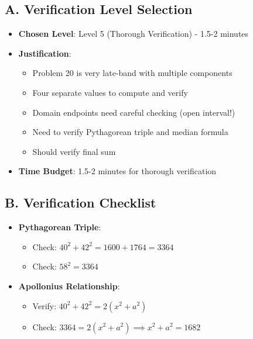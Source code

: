 \documentclass[12pt]{article}
\begin{document}
\begin{verificationbox}
\subsection*{A. Verification Level Selection}
\begin{itemize}[leftmargin=*]
    \item \textbf{Chosen Level}: Level 5 (Thorough Verification) - 1.5-2 minutes
    
    \item \textbf{Justification}: 
    \begin{itemize}
        \item Problem 20 is very late-band with multiple components
        \item Four separate values to compute and verify
        \item Domain endpoints need careful checking (open interval!)
        \item Need to verify Pythagorean triple and median formula
        \item Should verify final sum
    \end{itemize}
    
    \item \textbf{Time Budget}: 1.5-2 minutes for thorough verification
\end{itemize}

\subsection*{B. Verification Checklist}
\begin{itemize}[leftmargin=*]
    \item \textbf{Pythagorean Triple}:
    \begin{itemize}
        \item Check: $40^2 + 42^2 = 1600 + 1764 = 3364$
        \item Check: $58^2 = 3364$ \checkmark
    \end{itemize}
    
    \item \textbf{Apollonius Relationship}:
    \begin{itemize}
        \item Verify: $40^2 + 42^2 = 2(x^2 + a^2)$
        \item Check: $3364 = 2(x^2 + a^2) \implies x^2 + a^2 = 1682$ \checkmark
    \end{itemize}
    

\end{itemize}
\end{verificationbox}
\end{document}
